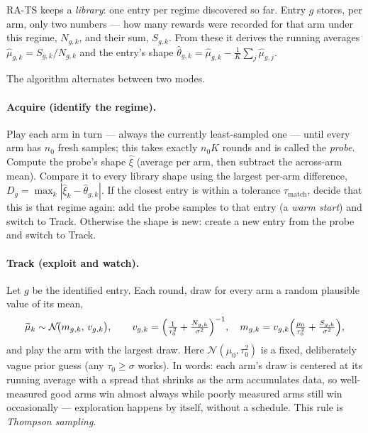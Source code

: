 \documentclass[11pt]{article}
\newcommand{\taum}{\tau_{\mathrm{match}}}
\begin{document}
RA-TS keeps a \emph{library}: one entry per regime discovered so far. Entry $g$ stores, per arm, only two numbers --- how many rewards were recorded for that arm under this regime, $N_{g,k}$, and their sum, $S_{g,k}$. From these it derives the running averages $\widehat\mu_{g,k}=S_{g,k}/N_{g,k}$ and the entry's shape $\widehat\theta_{g,k}=\widehat\mu_{g,k}-\frac1K\sum_j\widehat\mu_{g,j}$.

The algorithm alternates between two modes.

\paragraph{Acquire (identify the regime).}
Play each arm in turn --- always the currently least-sampled one --- until every arm has $n_0$ fresh samples; this takes exactly $n_0K$ rounds and is called the \emph{probe}. Compute the probe's shape $\widehat\xi$ (average per arm, then subtract the across-arm mean). Compare it to every library shape using the largest per-arm difference, $D_g=\max_k|\widehat\xi_k-\widehat\theta_{g,k}|$. If the closest entry is within a tolerance $\taum$, decide that this is that regime again: add the probe samples to that entry (a \emph{warm start}) and switch to Track. Otherwise the shape is new: create a new entry from the probe and switch to Track.

\paragraph{Track (exploit and watch).}
Let $g$ be the identified entry. Each round, draw for every arm a random plausible value of its mean,
\begin{equation}
    \widetilde\mu_k\sim\mathcal N\!\bigl(m_{g,k},\,v_{g,k}\bigr),
    \qquad
    v_{g,k}=\Bigl(\tfrac1{\tau_0^2}+\tfrac{N_{g,k}}{\sigma^2}\Bigr)^{-1},
    \quad
    m_{g,k}=v_{g,k}\Bigl(\tfrac{\mu_0}{\tau_0^2}+\tfrac{S_{g,k}}{\sigma^2}\Bigr),
    \label{eq:posterior}
\end{equation}
and play the arm with the largest draw. Here $\mathcal N(\mu_0,\tau_0^2)$ is a fixed, deliberately vague prior guess (any $\tau_0\ge\sigma$ works). In words: each arm's draw is centered at its running average with a spread that shrinks as the arm accumulates data, so well-measured good arms win almost always while poorly measured arms still win occasionally --- exploration happens by itself, without a schedule. This rule is \emph{Thompson sampling}.
\end{document}

